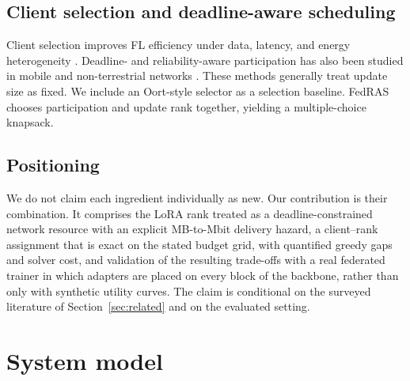 \documentclass[preprint,12pt]{elsarticle}
\begin{document}
\subsection{Client selection and deadline-aware scheduling}
Client selection improves FL efficiency under data, latency, and energy heterogeneity \cite{oort2021oort,chen2024clientselection,dong2024aoi,luo2021costeffective}. Deadline- and reliability-aware participation has also been studied in mobile and non-terrestrial networks \cite{razmi2022ground,tang2023flsagin,qin2024dfrl,ribero2023intermittent,han2024orchestrating}. These methods generally treat update size as fixed. We include an Oort-style selector as a selection baseline. FedRAS chooses participation and update rank together, yielding a multiple-choice knapsack.

\subsection{Positioning}
We do not claim each ingredient individually as new. Our contribution is their combination. It comprises the LoRA rank treated as a deadline-constrained network resource with an explicit MB-to-Mbit delivery hazard, a client--rank assignment that is exact on the stated budget grid, with quantified greedy gaps and solver cost, and validation of the resulting trade-offs with a real federated trainer in which adapters are placed on every block of the backbone, rather than only with synthetic utility curves. The claim is conditional on the surveyed literature of Section~\ref{sec:related} and on the evaluated setting.

\section{System model}
\label{sec:model}
\end{document}
